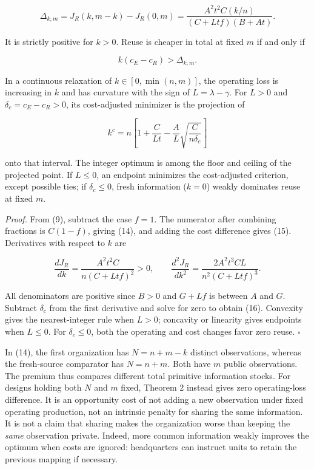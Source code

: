 \documentclass[
  11pt,
]{article}
\begin{document}
\[\Delta_{k,m}=J_R(k,m-k)-J_R(0,m)
=\frac{A^2t^2 C(k/n)}{(C+Ltf)(B+At)}. \tag{14}\]

It is strictly positive for \(k>0\). Reuse is cheaper in total at fixed
\(m\) if and only if

\[k(c_E-c_R)>\Delta_{k,m}. \tag{15}\]

In a continuous relaxation of \(k\in[0,\min(n,m)]\), the operating loss
is increasing in \(k\) and has curvature with the sign of
\(L=\lambda-\gamma\). For \(L>0\) and \(\delta_c=c_E-c_R>0\), its
cost-adjusted minimizer is the projection of

\[k^c=n\left[1+\frac C{Lt}-\frac A L\sqrt{\frac C{n\delta_c}}\right] \tag{16}\]

onto that interval. The integer optimum is among the floor and ceiling
of the projected point. If \(L\leq0\), an endpoint minimizes the
cost-adjusted criterion, except possible ties; if \(\delta_c\leq0\),
fresh information (\(k=0\)) weakly dominates reuse at fixed \(m\).

\emph{Proof.} From (9), subtract the case \(f=1\). The numerator after
combining fractions is \(C(1-f)\), giving (14), and adding the cost
difference gives (15). Derivatives with respect to \(k\) are

\[\frac{dJ_R}{dk}=\frac{A^2t^2C}{n(C+Ltf)^2}>0,\qquad
\frac{d^2J_R}{dk^2}=\frac{2A^2t^3CL}{n^2(C+Ltf)^3}. \tag{17}\]

All denominators are positive since \(B>0\) and \(G+Lf\) is between
\(A\) and \(G\). Subtract \(\delta_c\) from the first derivative and
solve for zero to obtain (16). Convexity gives the nearest-integer rule
when \(L>0\); concavity or linearity gives endpoints when \(L\leq0\).
For \(\delta_c\leq0\), both the operating and cost changes favor zero
reuse. \(\square\)

In (14), the first organization has \(N=n+m-k\) distinct observations,
whereas the fresh-source comparator has \(N=n+m\). Both have \(m\)
public observations. The premium thus compares different total primitive
information stocks. For designs holding both \(N\) and \(m\) fixed,
Theorem 2 instead gives zero operating-loss difference. It is an
opportunity cost of not adding a new observation under fixed operating
production, not an intrinsic penalty for sharing the same information.
It is not a claim that sharing makes the organization worse than keeping
the \emph{same} observation private. Indeed, more common information
weakly improves the optimum when costs are ignored: headquarters can
instruct units to retain the previous mapping if necessary.
\end{document}

